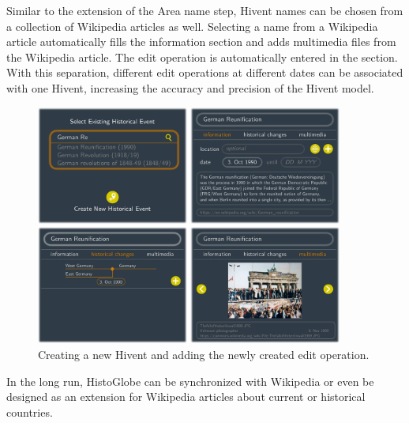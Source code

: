 Similar to the extension of the Area name step, Hivent names can be chosen from a collection of Wikipedia articles as well. Selecting a name from a Wikipedia article automatically fills the information section and adds multimedia files from the Wikipedia article. The edit operation is automatically entered in the section. With this separation, different edit operations at different dates can be associated with one Hivent, increasing the accuracy and precision of the Hivent model.

\begin{figure}[ht]
  \centering
  \includegraphics[width = 0.9\textwidth]{graphics/extensions/new_hivent_box}
  \caption{Creating a new Hivent and adding the newly created edit operation.}
  \label{fig:uncertainty_new_hivent_box}
\end{figure}

In the long run, HistoGlobe can be synchronized with Wikipedia or even be designed as an extension for Wikipedia articles about current or historical countries.




